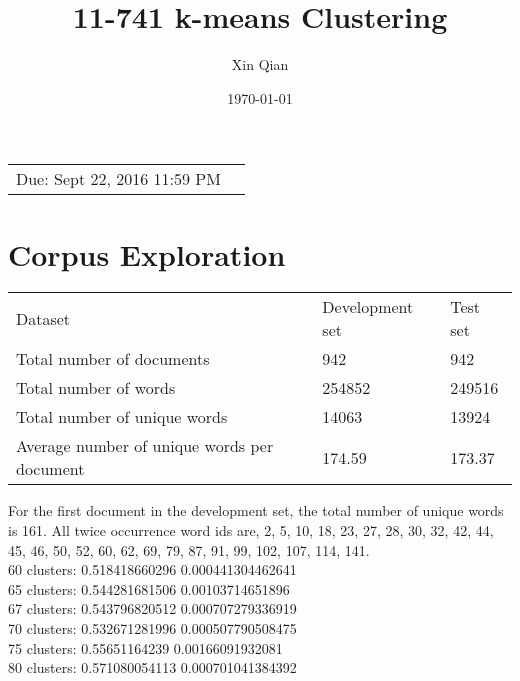 \documentclass{article}
\title{11-741 k-means Clustering} %
\author{Xin Qian} %
\date{\today} %
\begin{document}
\maketitle %

\begin{center}
\begin{tabular}{l r}
Due: Sept 22, 2016 11:59 PM\end{tabular}
\end{center}



\section{Corpus Exploration}
\begin{center}
\begin{tabular}{lll}
Dataset & Development set & Test set \\
Total number of documents & 942 & 942 \\
Total number of words & 254852 &249516\\
Total number of unique words& 14063&13924\\
Average number of unique words per document & 174.59&173.37
\end{tabular}
\end{center}

For the first document in the development set, the total number of unique words is 161. All twice occurrence word ids are,
2, 5, 10, 18, 23, 27, 28, 30, 32, 42, 44, 45, 46, 50, 52, 60, 62, 69, 79, 87, 91, 99, 102, 107, 114, 141.\\


60 clusters: 0.518418660296 0.000441304462641\\
65 clusters: 0.544281681506 0.00103714651896\\
67 clusters: 0.543796820512 0.000707279336919\\
70 clusters: 0.532671281996 0.000507790508475\\
75 clusters: 0.55651164239 0.00166091932081\\
80 clusters: 0.571080054113 0.000701041384392
\end{document}
